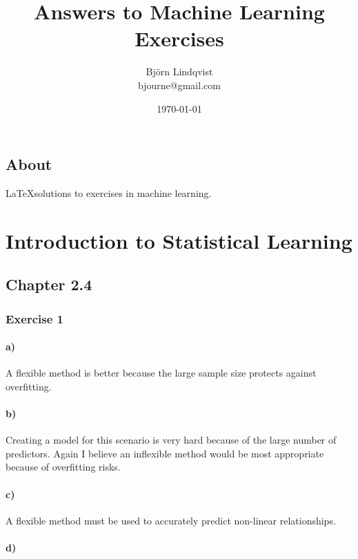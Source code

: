 \documentclass[10pt,a4paper]{article}
\title{Answers to Machine Learning Exercises}
\author{Björn Lindqvist\\bjourne@gmail.com}
\date{\today}
\begin{document}
\begin{titlingpage}
  \maketitle
  \thispagestyle{empty}
  \section*{About}
  \LaTeX solutions to exercises in machine learning.
  \tableofcontents
\end{titlingpage}

\section{Introduction to Statistical Learning}

\subsection{Chapter 2.4}

\subsubsection{Exercise 1}

\paragraph{a)}

A flexible method is better because the large sample size protects
against overfitting.

\paragraph{b)}

Creating a model for this scenario is very hard because of the large
number of predictors. Again I believe an inflexible method would be
most appropriate because of overfitting risks.

\paragraph{c)}

A flexible method must be used to accurately predict non-linear
relationships.

\paragraph{d)}
\end{document}

